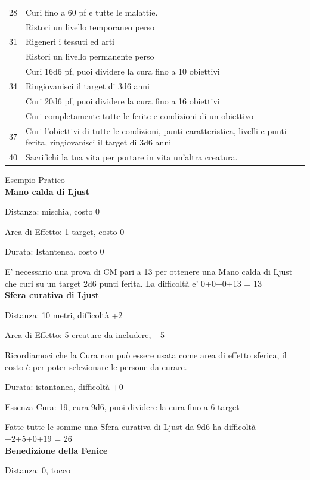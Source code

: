 \documentclass[a4paper,10 pt,twoside,openany]{book}
\begin{document}
\begin{tabularx}{0.95\textwidth}{lX}
	28     & Curi fino a 60 pf e tutte le malattie. \\
	& Ristori un livello temporaneo perso \\
	31     & Rigeneri i tessuti ed arti\\
	& Ristori un livello permanente perso\\
	& Curi 16d6 pf, puoi dividere la cura fino a 10 obiettivi\\
	34     & Ringiovanisci il target di 3d6 anni\\
	& Curi 20d6 pf, puoi dividere la cura fino a 16 obiettivi\\
	& Curi completamente tutte le ferite e condizioni di un obiettivo\\
	37     & Curi l'obiettivi di tutte le condizioni, punti caratteristica, livelli e punti ferita, ringiovanisci il target di 3d6 anni \\
	40     & Sacrifichi la tua vita per portare in vita un’altra creatura.\\
\end{tabularx}
\bigskip

Esempio Pratico\\

\textbf{Mano calda di Ljust}

Distanza: mischia, costo 0

Area di Effetto: 1 target, costo 0

Durata: Istantenea, costo 0

E’ necessario una prova di CM pari a 13 per ottenere una Mano calda di Ljust che curi su un target
2d6 punti ferita. La difficoltà e’ 0+0+0+13 = 13\\

\textbf{Sfera curativa di Ljust}

Distanza: 10 metri, difficoltà +2

Area di Effetto: 5 creature da includere, +5

Ricordiamoci che la Cura non può essere usata come area di effetto sferica, il costo è per poter selezionare le persone da curare.

Durata: istantanea, difficoltà +0

Essenza Cura: 19, cura 9d6, puoi dividere la cura fino a 6 target

Fatte tutte le somme una Sfera curativa di Ljust da 9d6 ha difficoltà +2+5+0+19 = 26\\

\textbf{Benedizione della Fenice}

Distanza: 0, tocco
\end{document}
